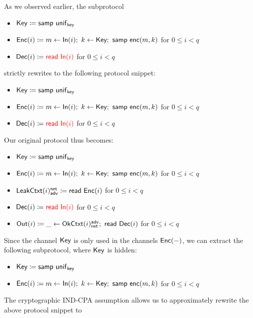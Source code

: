 \noindent As we observed earlier, the subprotocol

\begin{itemize}
\item $\mathsf{Key} \coloneqq \mathsf{samp} \ \mathsf{unif}_{\mathsf{key}}$
\item $\mathsf{Enc}(i) \coloneqq m \leftarrow \mathsf{In}(i); \ k \leftarrow \mathsf{Key}; \ \mathsf{samp} \ \mathsf{enc}(m,k)$ for $0 \leq i < q$
\item $\mathsf{Dec}(i) \coloneqq {\color{red} \mathsf{read} \ \mathsf{In}(i)}$ for $0 \leq i < q$
\end{itemize}

\noindent strictly rewrites to the following protocol snippet:

\begin{itemize}
\item $\mathsf{Key} \coloneqq \mathsf{samp} \ \mathsf{unif}_{\mathsf{key}}$
\item $\mathsf{Enc}(i) \coloneqq m \leftarrow \mathsf{In}(i); \ k \leftarrow \mathsf{Key}; \ \mathsf{samp} \ \mathsf{enc}(m,k)$ for $0 \leq i < q$
\item $\mathsf{Dec}(i) \coloneqq {\color{red} \mathsf{read} \ \mathsf{In}(i)}$ for $0 \leq i < q$
\end{itemize}

\noindent Our original protocol thus becomes:

\begin{itemize}
\item $\mathsf{Key} \coloneqq \mathsf{samp} \ \mathsf{unif}_{\mathsf{key}}$
\item $\mathsf{Enc}(i) \coloneqq m \leftarrow \mathsf{In}(i); \ k \leftarrow \mathsf{Key}; \ \mathsf{samp} \ \mathsf{enc}(m,k)$ for $0 \leq i < q$
\item $\mathsf{LeakCtxt}(i)^{\mathsf{net}}_{\mathsf{adv}} \coloneqq \mathsf{read} \ \mathsf{Enc}(i)$ for $0 \leq i < q$
\item $\mathsf{Dec}(i) \coloneqq {\color{red} \mathsf{read} \ \mathsf{In}(i)}$ for $0 \leq i < q$
\item $\mathsf{Out}(i) \coloneqq \_ \leftarrow \mathsf{OkCtxt}(i)^{\mathsf{adv}}_{\mathsf{net}}; \ \mathsf{read} \ \mathsf{Dec}(i)$ for $0 \leq i < q$
\end{itemize}

\noindent Since the channel $\mathsf{Key}$ is only used in the channels $\mathsf{Enc}(-)$, we can extract the following subprotocol, where $\mathsf{Key}$ is hidden:

\begin{itemize}
\item $\mathsf{Key} \coloneqq \mathsf{samp} \ \mathsf{unif}_{\mathsf{key}}$
\item $\mathsf{Enc}(i) \coloneqq m \leftarrow \mathsf{In}(i); \ k \leftarrow \mathsf{Key}; \ \mathsf{samp} \ \mathsf{enc}(m,k)$ for $0 \leq i < q$
\end{itemize}

\noindent The cryptographic IND-CPA assumption allows us to approximately rewrite the above protocol snippet to

